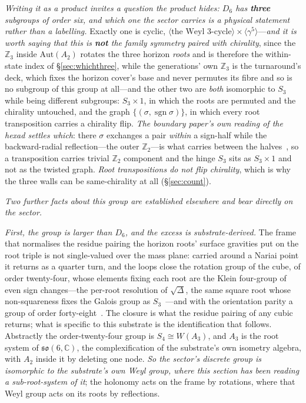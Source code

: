 \documentclass[11pt]{article}
\newcommand{\so}{\mathfrak{so}}
\begin{document}
\emph{Writing it as a product invites a question the product hides: $D_6$ has \textbf{three} subgroups of order six, and which one the sector carries is a physical statement rather than a labelling.} Exactly one is cyclic, $\langle\text{the Weyl }3\text{-cycle}\rangle\times\langle\gamma^5\rangle$---\emph{and it is worth saying that this is \textbf{not} the family symmetry paired with chirality}, since the $\mathbb{Z}_3$ inside $\mathrm{Aut}(A_2)$ rotates the three horizon \emph{roots} and is therefore the within-state index of \S\ref{sec:whichthree}, while the generations' own $\mathbb{Z}_3$ is the turnaround's deck, which fixes the horizon cover's base and never permutes its fibre and so is no subgroup of this group at all---and the other two are \emph{both} isomorphic to $S_3$ while being different subgroups: $S_3\times1$, in which the roots are permuted and the chirality untouched, and the graph $\{(\sigma,\operatorname{sgn}\sigma)\}$, in which every root transposition carries a chirality flip. \emph{The boundary paper's own reading of the hexad settles which}: there $\sigma$ exchanges a pair \emph{within} a sign-half while the backward-radial reflection---the outer $\mathbb{Z}_2$---is what carries between the halves~\cite{JanzenBoundary}, so a transposition carries trivial $\mathbb{Z}_2$ component and the hinge $S_3$ sits as $S_3\times1$ and not as the twisted graph. \emph{Root transpositions do not flip chirality}, which is why the three walls can be same-chirality at all (\S\ref{sec:count}).

\emph{Two further facts about this group are established elsewhere and bear directly on the sector.}

\emph{First, the group is larger than $D_{6}$, and the excess is substrate-derived.} The frame that normalises the
residue pairing the horizon roots' surface gravities put on the root triple is not single-valued over the mass
plane: carried around a Nariai point it returns as a quarter turn, and the loops close the rotation group of the
cube, of order twenty-four, whose elements fixing each root are the Klein four-group of even sign changes---the
per-root resolution of $\sqrt{\Delta}$, the same square root whose non-squareness fixes the Galois group as
$S_{3}$~\cite{JanzenGroupoid}---and with the orientation parity a group of order forty-eight~\cite{JanzenAlgebroid}. The closure is what the residue pairing of any cubic returns; what is specific to this substrate is the identification that follows.
Abstractly the order-twenty-four group is $S_{4}\cong W(A_{3})$, and $A_{3}$ is the root system of
$\so(6,\mathbb{C})$, the complexification of the substrate's own isometry algebra, with $A_{2}$ inside it by deleting
one node. \emph{So the sector's discrete group is isomorphic to the substrate's own Weyl group, where this
section has been reading a sub-root-system of it}; the holonomy acts on the frame by rotations, where that Weyl
group acts on its roots by reflections.
\end{document}
